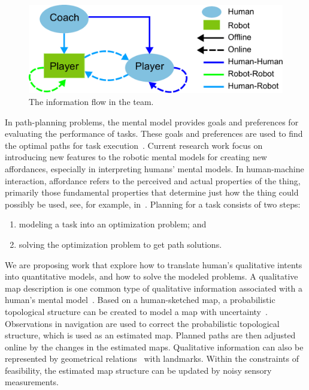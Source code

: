 \documentclass[phd]{byuprop}
\begin{document}
\begin{figure}[hbtp]
\centering
\includegraphics[width=0.6\linewidth]{./fig/team_info_flow.pdf}
\caption{The information flow in the team.}
\label{fig:team_info_flow}
\end{figure}

In path-planning problems, the mental model provides goals and preferences for evaluating the performance of tasks.
These goals and preferences are used to find the optimal paths for task execution~\cite{choset2005principles}.
Current research work focus on introducing new features to the robotic mental models for creating new affordances, especially in interpreting humans' mental models.
In human-machine interaction, affordance refers to the perceived and actual properties of the thing, primarily those fundamental properties that determine just how the thing could possibly be used, see, for example, in~\cite{norman2013design}.
Planning for a task consists of two steps:
\begin{enumerate}
\item modeling a task into an optimization problem; and
\item solving the optimization problem to get path solutions.
\end{enumerate}

We are proposing work that explore how to translate human's qualitative intents into quantitative models, and how to solve the modeled problems.
A qualitative map description is one common type of qualitative information associated with a human's mental model~\cite{kuipers1999}.
Based on a human-sketched map, a probabilistic topological structure can be created to model a map with uncertainty~\cite{Shah2013}.
Observations in navigation are used to correct the probabilistic topological structure, which is used as an estimated map.
Planned paths are then adjusted online by the changes in the estimated maps.
Qualitative information can also be represented by geometrical relations~\cite{mcclelland2012qualitative,mcclelland2014qualitative} with landmarks.
Within the constraints of feasibility, the estimated map structure can be updated by noisy sensory measurements.
\end{document}
